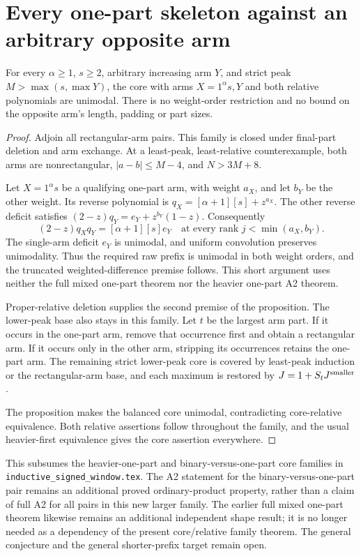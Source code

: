 \section{Every one-part skeleton against an arbitrary opposite arm}
\begin{theorem}\label{thm:all-onepart-arms}
For every $\alpha\ge1$, $s\ge2$, arbitrary increasing arm
$Y$, and strict peak $M>\max(s,\max Y)$, the core with arms
$X=1^\alpha s,Y$ and both relative polynomials are unimodal.
There is no weight-order restriction and no bound on the
opposite arm's length, padding or part sizes.
\end{theorem}
\begin{proof}
Adjoin all rectangular-arm pairs. This family is closed under
final-part deletion and arm exchange. At a least-peak,
least-relative counterexample, both arms are nonrectangular,
$|a-b|\le M-4$, and $N>3M+8$.

Let $X=1^\alpha s$ be a qualifying one-part arm, with weight
$a_X$, and let $b_Y$ be the other weight. Its reverse polynomial
is $q_X=[\alpha+1][s]+z^{a_X}$. The other reverse deficit
satisfies $(2-z)q_Y=e_Y+z^{b_Y}(1-z)$. Consequently
\[
 (2-z)q_Xq_Y=[\alpha+1][s]e_Y
       \quad\text{at every rank }j<\min(a_X,b_Y).
\]
The single-arm deficit $e_Y$ is unimodal, and uniform convolution
preserves unimodality. Thus the required raw prefix is unimodal
in both weight orders, and the truncated weighted-difference
premise follows. This short argument uses neither the full mixed
one-part theorem nor the heavier one-part A2 theorem.

Proper-relative deletion supplies the second premise of the
proposition. The lower-peak base also stays in this family.
Let $t$ be the largest arm part. If it occurs in the one-part
arm, remove that occurrence first and obtain a rectangular
arm. If it occurs only in the other arm, stripping its
occurrences retains the one-part arm. The remaining strict
lower-peak core is covered by least-peak induction or the
rectangular-arm base, and each maximum is restored by
$J=1+S_tJ^{\rm smaller}$.

The proposition makes the balanced core unimodal, contradicting
core-relative equivalence. Both relative assertions follow
throughout the family, and the usual heavier-first equivalence
gives the core assertion everywhere.
\end{proof}

This subsumes the heavier-one-part and binary-versus-one-part
core families in \texttt{inductive\_signed\_window.tex}.
The A2 statement for the binary-versus-one-part pair remains
an additional proved ordinary-product property, rather than
a claim of full A2 for all pairs in this new larger family.
The earlier full mixed one-part theorem likewise remains an
additional independent shape result; it is no longer needed
as a dependency of the present core/relative family theorem.
The general conjecture and the general shorter-prefix target
remain open.

